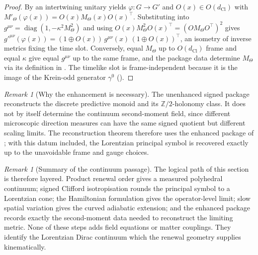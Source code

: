 \documentclass[11pt]{article}
\theoremstyle{definition}
\theoremstyle{remark}
\newtheorem{remark}[theorem]{Remark}
\newcommand{\Z}{\mathbb{Z}}
\newcommand{\dCl}{d_{\mathrm{Cl}}}
\newcommand{\diag}{\operatorname{diag}}
\begin{document}
\begin{proof}
By  an intertwining unitary yields
$\varphi:G\to G'$ and $O(x)\in O(\dCl)$ with
$M'_\Theta(\varphi(x))=O(x)M_\Theta(x)O(x)^{\top}$.  Substituting into
$g^{\mu\nu}=\diag(1,-\kappa^2M_\Theta^2)$ and using
$O(x)M_\Theta^2O(x)^{\top}=(O M_\Theta O^{\top})^2$ gives
$g'^{\mu\nu}(\varphi(x))=(1\oplus O(x))\,g^{\mu\nu}(x)\,(1\oplus O(x))^{\top}$,
an isometry of inverse metrics fixing the time slot.  Conversely, equal
$M_\Theta$ up to $O(\dCl)$ frame and equal $\kappa$ give equal $g^{\mu\nu}$ up to
the same frame, and the package data determine $M_\Theta$ via its definition in
.  The timelike slot is frame-independent because it
is the image of the Krein-odd generator $\gamma^0$ ().
\end{proof}



\begin{remark}[Why the enhancement is necessary]
\label{rem:enhancement-necessary}
The unenhanced signed package reconstructs the discrete predictive monoid and
its \(\Z/2\)-holonomy class.  It does not by itself determine the continuum
second-moment field, since different microscopic direction measures can have the
same signed quotient but different scaling limits.  The reconstruction theorem
therefore uses the enhanced package of ; with this
datum included, the Lorentzian principal symbol is recovered exactly up to the
unavoidable frame and gauge choices.
\end{remark}


\begin{remark}[Summary of the continuum passage]
\label{rem:continuum-summary-final}
The logical path of this section is therefore layered.  Product renewal order
gives a measured polyhedral continuum; signed Clifford isotropisation rounds the
principal symbol to a Lorentzian cone; the Hamiltonian formulation gives the
operator-level limit; slow spatial variation gives the curved adiabatic
extension; and the enhanced package records exactly the second-moment data
needed to reconstruct the limiting metric.  None of these steps adds field
equations or matter couplings.  They identify the Lorentzian Dirac continuum
which the renewal geometry supplies kinematically.
\end{remark}



\end{document}
